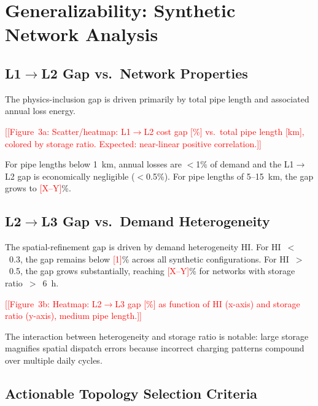 \documentclass[review,3p]{elsarticle}
\newcommand{\placeholder}[1]{\textcolor{red}{[#1]}}
\begin{document}
\section{Generalizability: Synthetic Network Analysis}
\label{sec:generalizability}

\subsection{L1$\rightarrow$L2 Gap vs.\ Network Properties}
\label{sec:gen_L1L2}

The physics-inclusion gap is driven primarily by total pipe length and
associated annual loss energy.

\placeholder{[Figure~3a: Scatter/heatmap: L1$\rightarrow$L2 cost gap
[\%] vs.\ total pipe length [km], colored by storage ratio.
Expected: near-linear positive correlation.]}

For pipe lengths below 1~km, annual losses are $<$1\% of demand and
the L1$\rightarrow$L2 gap is economically negligible ($<$0.5\%). For
pipe lengths of 5--15~km, the gap grows to \placeholder{X--Y}\%.

\subsection{L2$\rightarrow$L3 Gap vs.\ Demand Heterogeneity}
\label{sec:gen_L2L3}

The spatial-refinement gap is driven by demand heterogeneity HI.
For HI~$<$~0.3, the gap remains below \placeholder{1}\% across all
synthetic configurations. For HI~$>$~0.5, the gap grows substantially,
reaching \placeholder{X--Y}\% for networks with storage ratio~$>$~6~h.

\placeholder{[Figure~3b: Heatmap: L2$\rightarrow$L3 gap [\%] as
function of HI (x-axis) and storage ratio (y-axis), medium pipe
length.]}

The interaction between heterogeneity and storage ratio is notable:
large storage magnifies spatial dispatch errors because incorrect
charging patterns compound over multiple daily cycles.

\subsection{Actionable Topology Selection Criteria}
\label{sec:gen_criteria}
\end{document}
